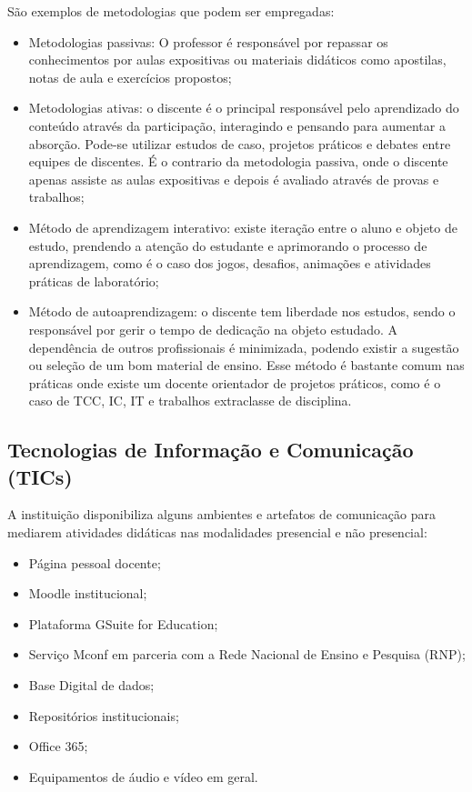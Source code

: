São exemplos de metodologias que podem ser empregadas:

\begin{itemize}
	\item Metodologias passivas: O professor é responsável por repassar os conhecimentos por aulas expositivas ou materiais didáticos como apostilas, notas de aula e exercícios propostos;
	\item Metodologias ativas: o discente é o principal responsável pelo aprendizado do conteúdo através da participação, interagindo e pensando para aumentar a absorção. Pode-se utilizar estudos de caso, projetos práticos e debates entre equipes de discentes. É o contrario da metodologia passiva, onde o discente apenas assiste as aulas expositivas e depois é avaliado através de provas e trabalhos;
	\item Método de aprendizagem interativo: existe iteração entre o aluno e objeto de estudo, prendendo a atenção do estudante e aprimorando o processo de aprendizagem, como é o caso dos jogos, desafios, animações e atividades práticas de laboratório;
	\item Método de autoaprendizagem: o discente tem liberdade nos estudos, sendo o responsável por gerir o tempo de dedicação na objeto estudado. A dependência de outros profissionais é minimizada, podendo existir a sugestão ou seleção de um bom material de ensino. Esse método é bastante comum nas práticas onde existe um docente orientador de projetos práticos, como é o caso de TCC, IC, IT e trabalhos extraclasse de disciplina.
\end{itemize}



\subsection{Tecnologias de Informação e Comunicação (TICs)}

A instituição disponibiliza alguns ambientes e artefatos de comunicação para mediarem atividades didáticas nas modalidades presencial e não presencial:

\begin{itemize}
    \item Página pessoal docente;
    \item Moodle institucional;
    \item Plataforma GSuite for Education;
    \item Serviço Mconf em parceria com a Rede Nacional de Ensino e Pesquisa (RNP);
    \item Base Digital de dados;
    \item Repositórios institucionais;
    \item Office 365;
    \item Equipamentos de áudio e vídeo em geral.
\end{itemize}
    
